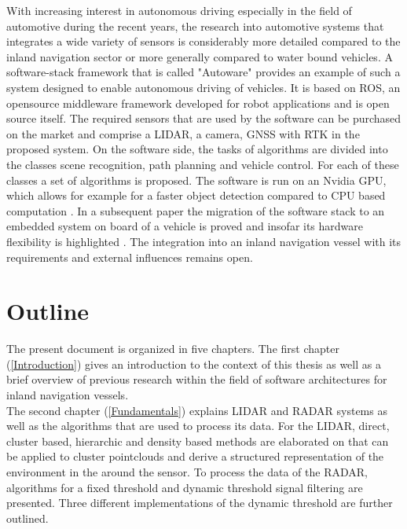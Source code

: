  With increasing interest in autonomous driving especially in the field of automotive during the recent years, the research into automotive systems that integrates a wide variety of sensors is considerably more detailed compared to the inland navigation sector or more generally compared to water bound vehicles. A software-stack framework that is called "Autoware" provides an example of such a system designed to enable autonomous driving of vehicles. It is based on \ac{ROS}, an opensource middleware framework developed for robot applications and is open source itself. The required sensors that are used by the software can be purchased on the market and comprise a \ac{LIDAR}, a camera, \ac{GNSS}  with \ac{RTK} in the proposed system. On the software side, the tasks of algorithms are divided into the classes scene recognition, path planning and vehicle control. For each of these classes a set of algorithms is proposed. The software is run on an Nvidia \ac{GPU}, which allows for example for a faster object detection compared to \ac{CPU} based computation \cite{Autoware}. In a subsequent paper the migration of the software stack to an embedded system on board of a vehicle is proved and insofar its hardware flexibility is highlighted \cite{AutowareEmbedd}. The integration into an inland navigation vessel with its requirements and external influences remains open.
 
 \section{Outline}\label{Ziel}
 
 The present document is organized in five chapters. The first chapter (\ref{Introduction}) gives an introduction to the context of this thesis as well as a brief overview of previous research within the field of software architectures for inland navigation vessels.\\
 
 The second chapter (\ref{Fundamentals}) explains \ac{LIDAR} and \ac{RADAR} systems as well as the algorithms that are used to process its data. For the \ac{LIDAR}, direct, cluster based, hierarchic and density based methods are elaborated on that can be applied to cluster pointclouds and derive a structured representation of the environment in the around the sensor. To process the data of the \ac{RADAR}, algorithms for a fixed threshold and dynamic threshold signal filtering are presented. Three different implementations of the dynamic threshold are further outlined.\\
  
